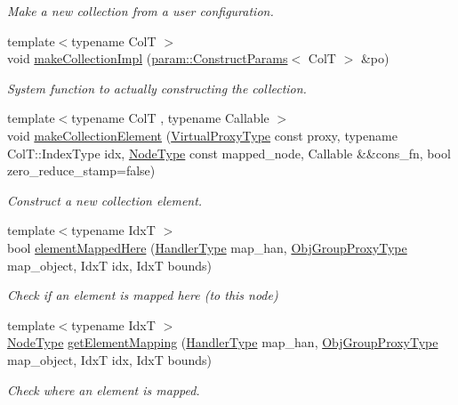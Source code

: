 \begin{DoxyCompactItemize}
\begin{DoxyCompactList}\small\item\em Make a new collection from a user configuration. \end{DoxyCompactList}\item 
{\footnotesize template$<$typename ColT $>$ }\\void \hyperlink{structvt_1_1vrt_1_1collection_1_1_collection_manager_a900349a13b2e0382b6731215b4324161}{make\+Collection\+Impl} (\hyperlink{structvt_1_1vrt_1_1collection_1_1param_1_1_construct_params}{param\+::\+Construct\+Params}$<$ ColT $>$ \&po)
\begin{DoxyCompactList}\small\item\em System function to actually constructing the collection. \end{DoxyCompactList}\item 
{\footnotesize template$<$typename ColT , typename Callable $>$ }\\void \hyperlink{structvt_1_1vrt_1_1collection_1_1_collection_manager_a22caeaf37970241107ac2981126ee6df}{make\+Collection\+Element} (\hyperlink{namespacevt_a1b417dd5d684f045bb58a0ede70045ac}{Virtual\+Proxy\+Type} const proxy, typename Col\+T\+::\+Index\+Type idx, \hyperlink{namespacevt_a866da9d0efc19c0a1ce79e9e492f47e2}{Node\+Type} const mapped\+\_\+node, Callable \&\&cons\+\_\+fn, bool zero\+\_\+reduce\+\_\+stamp=false)
\begin{DoxyCompactList}\small\item\em Construct a new collection element. \end{DoxyCompactList}\item 
{\footnotesize template$<$typename IdxT $>$ }\\bool \hyperlink{structvt_1_1vrt_1_1collection_1_1_collection_manager_a0af41830e89efe84a071d3dcb1296b1b}{element\+Mapped\+Here} (\hyperlink{namespacevt_af64846b57dfcaf104da3ef6967917573}{Handler\+Type} map\+\_\+han, \hyperlink{namespacevt_ad7cae989df485fccca57f0792a880a8e}{Obj\+Group\+Proxy\+Type} map\+\_\+object, IdxT idx, IdxT bounds)
\begin{DoxyCompactList}\small\item\em Check if an element is mapped here (to this node) \end{DoxyCompactList}\item 
{\footnotesize template$<$typename IdxT $>$ }\\\hyperlink{namespacevt_a866da9d0efc19c0a1ce79e9e492f47e2}{Node\+Type} \hyperlink{structvt_1_1vrt_1_1collection_1_1_collection_manager_a899158015e2abd7d39eda2c7715e2632}{get\+Element\+Mapping} (\hyperlink{namespacevt_af64846b57dfcaf104da3ef6967917573}{Handler\+Type} map\+\_\+han, \hyperlink{namespacevt_ad7cae989df485fccca57f0792a880a8e}{Obj\+Group\+Proxy\+Type} map\+\_\+object, IdxT idx, IdxT bounds)
\begin{DoxyCompactList}\small\item\em Check where an element is mapped. \end{DoxyCompactList}\end{DoxyCompactItemize}
